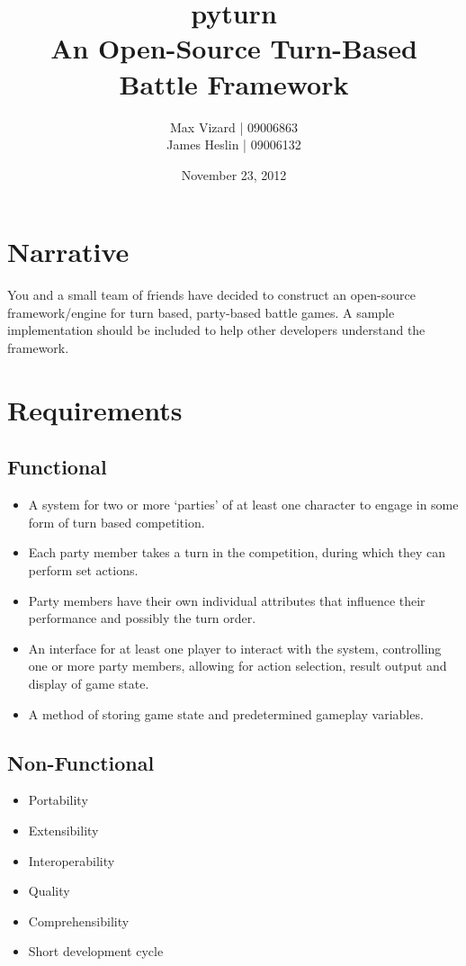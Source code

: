 \documentclass[11pt]{report}
\title{\textbf{pyturn}\\
An Open-Source Turn-Based Battle Framework}
\author{Max Vizard | 09006863\\
		James Heslin | 09006132\\}
\date{November 23, 2012}
\begin{document}
\maketitle

\tableofcontents{}

\pagebreak

\section{Narrative}
You and a small team of friends have decided to construct an open-source framework/engine for turn based, party-based battle games. A sample implementation should be included to help other developers understand the framework. 

\section{Requirements}
	\subsection{Functional}
	\begin{itemize}
			\item{A system for two or more ‘parties’ of at least one character to engage in some form of turn based competition.}
			\item{Each party member takes a turn in the competition, during which they can perform set actions.}
			\item{Party members have their own individual attributes that influence their performance and possibly the turn order.}
			\item{An interface for at least one player to interact with the system, controlling one or more party members, allowing for action selection, result output and display of game state.}
			\item{A method of storing game state and predetermined gameplay variables.}
	\end{itemize}
	\subsection{Non-Functional}
	\begin{itemize}
		\item{Portability}
		\item{Extensibility}
		\item{Interoperability}
		\item{Quality}
		\item{Comprehensibility}
		\item{Short development cycle}
	\end{itemize}
\end{document}
